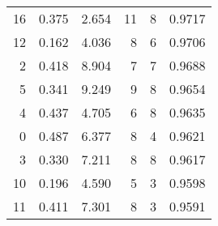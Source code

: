 \documentclass[11pt]{diazessay}
\begin{document}
\begin{table}[h]
\begin{tabular}{@{}rrrrrr@{}}
		16                                     & 0.375                            & 2.654                              & 11                                      & 8                                               & 0.9717                                           \\
		12                                     & 0.162                            & 4.036                              & 8                                       & 6                                               & 0.9706                                           \\
		2                                      & 0.418                            & 8.904                              & 7                                       & 7                                               & 0.9688                                           \\
		5                                      & 0.341                            & 9.249                              & 9                                       & 8                                               & 0.9654                                           \\
		4                                      & 0.437                            & 4.705                              & 6                                       & 8                                               & 0.9635                                           \\
		0                                      & 0.487                            & 6.377                              & 8                                       & 4                                               & 0.9621                                           \\
		3                                      & 0.330                            & 7.211                              & 8                                       & 8                                               & 0.9617                                           \\
		10                                     & 0.196                            & 4.590                              & 5                                       & 3                                               & 0.9598                                           \\
		11                                     & 0.411                            & 7.301                              & 8                                       & 3                                               & 0.9591                                           \\

\end{tabular}
\end{table}
\end{document}
